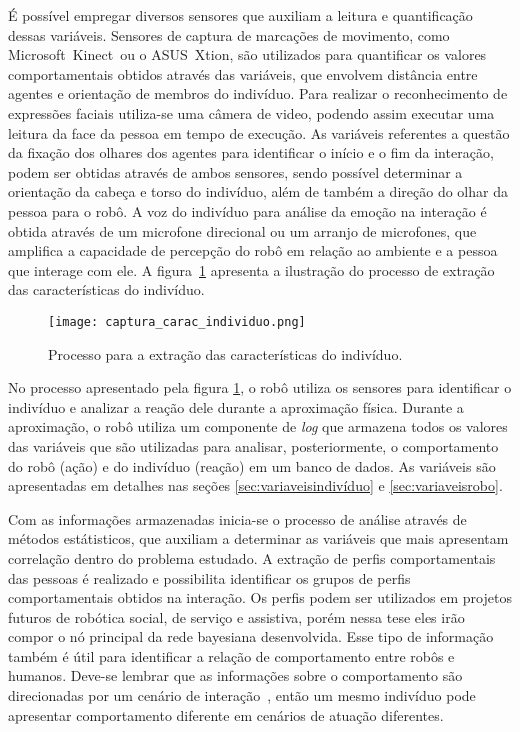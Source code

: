 É possível empregar diversos sensores que auxiliam a leitura e quantificação dessas variáveis. Sensores de captura de marcações de movimento, como Microsoft\textregistered\ Kinect\textregistered\ ou o ASUS\textregistered\ Xtion\textregistered, são utilizados para quantificar os valores comportamentais obtidos através das variáveis, que envolvem distância entre agentes e orientação de membros do indivíduo. Para realizar o reconhecimento de expressões faciais utiliza-se uma câmera de video, podendo assim executar uma leitura da face da pessoa em tempo de execução. As variáveis referentes a questão da fixação dos olhares dos agentes para identificar o início e o fim da interação, podem ser obtidas através de ambos sensores, sendo possível determinar a orientação da cabeça e torso do indivíduo, além de também a direção do olhar da pessoa para o robô. A voz do indivíduo para análise da emoção na interação é obtida através de um microfone direcional ou um arranjo de microfones, que amplifica a capacidade de percepção do robô em relação ao ambiente e a pessoa que interage com ele. A figura~\ref{fig:capturacaracteristicas} apresenta a ilustração do processo de extração das características do indivíduo.

\begin{figure}[ht!]
	\centering
	\begin{minipage}{0.8\textwidth}
		\caption{Processo para a extração das características do indivíduo.}
		\texttt{[image: captura\_carac\_individuo.png]}
		\label{fig:capturacaracteristicas}
	\end{minipage}
\end{figure}

No processo apresentado pela figura \ref{fig:capturacaracteristicas}, o robô utiliza os sensores para identificar o indivíduo e analizar a reação dele durante a aproximação física. Durante a aproximação, o robô utiliza um componente de \emph{log} que armazena todos os valores das variáveis que são utilizadas para analisar, posteriormente, o comportamento do robô (ação) e do indivíduo (reação) em um banco de dados. As variáveis são apresentadas em detalhes nas seções \ref{sec:variaveisindivíduo} e \ref{sec:variaveisrobo}.

Com as informações armazenadas inicia-se o processo de análise através de métodos estátisticos, que auxiliam a determinar as variáveis que mais apresentam correlação dentro do problema estudado. A extração de perfis comportamentais das pessoas é realizado e possibilita identificar os grupos de perfis comportamentais obtidos na interação. Os perfis podem ser utilizados em projetos futuros de robótica social, de serviço e assistiva, porém nessa tese eles irão compor o nó principal da rede bayesiana desenvolvida. Esse tipo de informação também é útil para identificar a relação de comportamento entre robôs e humanos. Deve-se lembrar que as informações sobre o comportamento são direcionadas por um cenário de interação~\cite{jung:1991}, então um mesmo indivíduo pode apresentar comportamento diferente em cenários de atuação diferentes.

